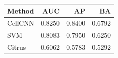 \begin{tabular}{lrrr}
\toprule
Method & AUC & AP & BA \\
\midrule
CellCNN & 0.8250 & 0.8400 & 0.6792 \\
SVM & 0.8083 & 0.7950 & 0.6250 \\
Citrus & 0.6062 & 0.5783 & 0.5292 \\
\bottomrule
\end{tabular}
